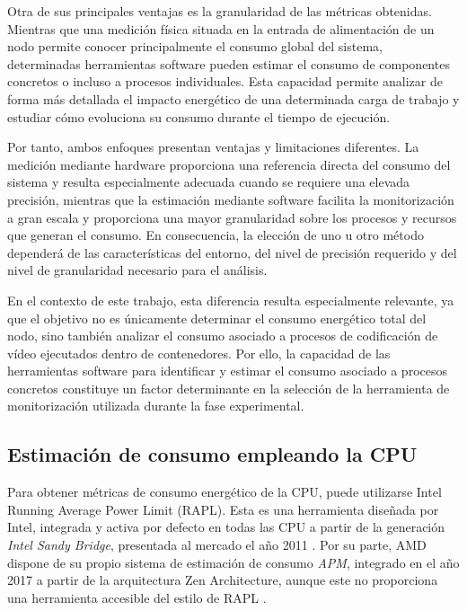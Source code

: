  Otra de sus principales ventajas es la granularidad de las métricas obtenidas. Mientras que una medición física situada en la entrada de alimentación de un nodo permite conocer principalmente el consumo global del sistema, determinadas herramientas software pueden estimar el consumo de componentes concretos o incluso a procesos individuales. Esta capacidad permite analizar de forma más detallada el impacto energético de una determinada carga de trabajo y estudiar cómo evoluciona su consumo durante el tiempo de ejecución.
 
 Por tanto, ambos enfoques presentan ventajas y limitaciones diferentes. La medición mediante hardware proporciona una referencia directa del consumo del sistema y resulta especialmente adecuada cuando se requiere una elevada precisión, mientras que la estimación mediante software facilita la monitorización a gran escala y proporciona una mayor granularidad sobre los procesos y recursos que generan el consumo. En consecuencia, la elección de uno u otro método dependerá de las características del entorno, del nivel de precisión requerido y del nivel de granularidad necesario para el análisis.
 
 En el contexto de este trabajo, esta diferencia resulta especialmente relevante, ya que el objetivo no es únicamente determinar el consumo energético total del nodo, sino también analizar el consumo asociado a procesos de codificación de vídeo ejecutados dentro de contenedores. Por ello, la capacidad de las herramientas software para identificar y estimar el consumo asociado a procesos concretos constituye un factor determinante en la selección de la herramienta de monitorización utilizada durante la fase experimental.
 
\subsection{Estimación de consumo empleando la CPU}
 Para obtener métricas de consumo energético de la CPU, puede utilizarse Intel Running Average Power Limit (RAPL). Esta es una herramienta diseñada por Intel, integrada y activa por defecto en todas las CPU a partir de la generación \textit{Intel Sandy Bridge}, presentada al mercado el año 2011 \cite{cpu-measurement-intel-amd}. Por su parte, AMD dispone de su propio sistema de estimación de consumo \textit{APM}, integrado en el año 2017 a partir de la arquitectura Zen Architecture, aunque este no proporciona una herramienta accesible del estilo de RAPL \cite{coparative-rapl-amp} \cite{survery-amd-research}.

